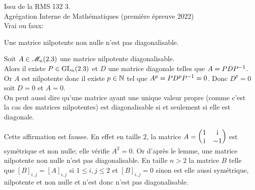 \begin{exercice}
    Issu de la RMS 132 3. \\
    Agrégation Interne de Mathématiques (première épreuve 2022) \\
    Vrai ou faux: 
\end{exercice}

\begin{solution}
    \newline
    \begin{lemme}
        Une matrice nilpotente non nulle n'est pas diagonalisable.
    \end{lemme}
    
    \begin{preuve}
        Soit $A \in \mathscr{M}_n(2.3)$ une matrice nilpotente diagonalisable. \\
        Alors il existe $P \in \mathrm{GL}_n(2.3)$ et $D$ une matrice diagonale telles que $A = PDP^{-1}$. Or $A$ est nilpotente donc il existe $p \in \mathbb{N}$ tel que $A^p = P D^p P^{-1} = 0$. Donc $D^p = 0$ soit $D = 0$ et $A = 0$. \\
        On peut aussi dire qu'une matrice ayant une unique valeur propre (comme c'est la cas des matrices nilpotentes) est diagonalisable si et seulement si elle est diagonale.
    \end{preuve}
    Cette affirmation est fausse. En effet en taille $2$, la matrice $A = \begin{pmatrix}
        1 & \mathrm{i} \\
        \mathrm{i} & -1
    \end{pmatrix}$ est symétrique et non nulle; elle vérifie $A^2 = 0$. Or d'après le lemme, une matrice nilpotente non nulle n'est pas diagonalisable. En taille $n > 2$ la matrice $B$ telle que $[B]_{i,j} = [A]_{i,j}$ si $1 \leqslant i, j \leqslant 2$ et $[B]_{i,j} = 0$ sinon est elle aussi symétrique, nilpotente et non nulle et n'est donc n'est pas diagonalisable. 
\end{solution}   

